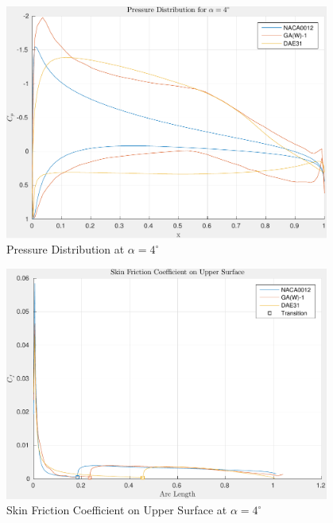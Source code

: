 \documentclass[letterpaper,12pt,]{article}
\begin{document}
\begin{figure}[!h]
    \centering
    \includegraphics[width = 0.95\textwidth]{./figures/q4pressure.pdf}
    \caption{Pressure Distribution at $\alpha = 4^\circ$}
    \label{fig:q4c}
\end{figure}

\begin{figure}[!h]
    \centering
    \includegraphics[width = 0.95\textwidth]{./figures/q4uppercf.pdf}
    \caption{Skin Friction Coefficient on Upper Surface at $\alpha = 4^\circ$}
    \label{fig:q4dupper}
\end{figure}
\end{document}
